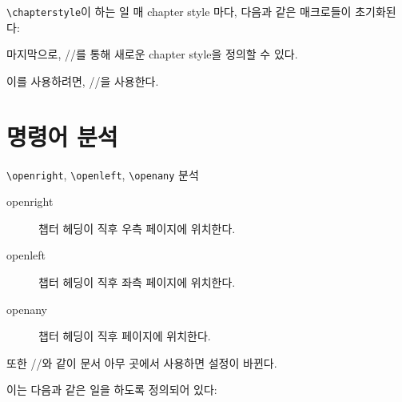\documentclass{beamer}
\def\tbs{\textbackslash}
\begin{document}
\begin{frame}[fragile]{\texttt{\textbackslash chapterstyle}이 하는 일}
  매 chapter style 마다, 다음과 같은 매크로들이 초기화된다:
  \begin{latexcode}
    \renewcommand\chapterheadstart{\vspace*{\beforechapskip}}
    \renewcommand\printchaptername{\chapnamefont \@chapapp}
    \renewcommand\chapternamenum{\space}
    \renewcommand\printchapternum{\chapnumfont \thechapter}
    \renewcommand\afterchapternum{\par\nobreak\vskip \midchapskip}
    \renewcommand\printchapternonum{}
    \renewcommand\printchaptertitle[1]{\chaptitlefont #1}
    \renewcommand\afterchaptertitle{\par\nobreak\vskip \afterchapskip}
  \end{latexcode}

  \pause
  마지막으로, \ltxverb//를 통해 새로운
  chapter style을 정의할 수 있다.

  이를 사용하려면, \ltxverb//을 사용한다.
\end{frame}


\section{명령어 분석}

\begin{frame}[fragile]
  {\texttt{\tbs openright}, \texttt{\tbs openleft}, \texttt{\tbs openany} 분석}
  \begin{description}
    \item[openright] 챕터 헤딩이 직후 우측 페이지에 위치한다.
    \item[openleft] 챕터 헤딩이 직후 좌측 페이지에 위치한다.
    \item[openany] 챕터 헤딩이 직후 페이지에 위치한다.
  \end{description}

  또한 \ltxverb/\openright/와 같이 문서 아무 곳에서 사용하면 설정이 바뀐다.

  \pause
  이는 다음과 같은 일을 하도록 정의되어 있다:
  \begin{latexcode}
    \newcommand{\openright}{\@openrighttrue\@openleftfalse%
      \gdef\clearforchapter{\cleartorecto}}
    \newcommand{\openany}{\@openrightfalse\@openleftfalse%
      \gdef\clearforchapter{\clearpage}}
    \newcommand{\openleft}{\@openlefttrue
      \gdef\clearforchapter{\cleartoverso}}
  \end{latexcode}
\end{frame}
\end{document}
